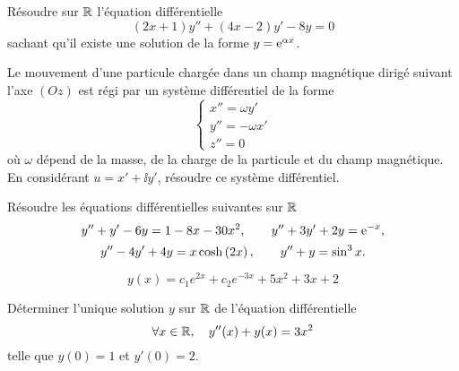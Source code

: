 \documentclass{magnolia}
\begin{document}
Résoudre sur $\mathbb{R}$ l'équation différentielle
\[(2x+1)y''+(4x-2)y'-8y=0\]
sachant qu'il existe une solution de la forme $y={\rm e}^{\alpha x}$.

Le mouvement d'une particule chargée dans un champ magnétique dirigé suivant
l'axe $(Oz)$ est régi par un système différentiel de la forme
$$\left\lbrace
\begin{array}{l}
x''=\omega y'\\
y''=-\omega x'\\
z''=0
\end{array}
\right.$$
où $\omega$ dépend de la masse, de la charge de la particule et du champ
magnétique. En considérant  $u=x'+\ii y'$, résoudre ce système différentiel.



Résoudre les équations différentielles suivantes sur $\mathbb{R}$
\[y''+y'-6y=1-8x-30x^2, \qquad y''+3y'+2y={\rm e}^{-x},\]
\[y''-4y'+4y=x\cosh\left(2x\right), \qquad y''+y=\sin^3 x.\]
\begin{sol}
\[y(x)=c_1 e^{2x}+c_2 e^{-3x}+5x^2+3x+2\]
\end{sol}



Déterminer l'unique solution $y$ sur $\mathbb{R}$ de l'équation différentielle
\[\forall x\in\mathbb{R},\quad y''(x)+y(x)=3x^2\]
telle que $y(0)=1$ et $y'(0)=2$.


\end{document}
